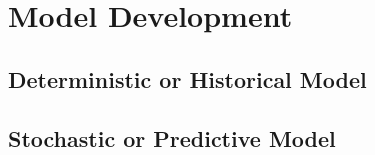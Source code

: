 
\renewcommand{\thechapter}{5}

\chapter{Model Development}

\section{Deterministic or Historical Model}

\section{Stochastic or Predictive Model}
